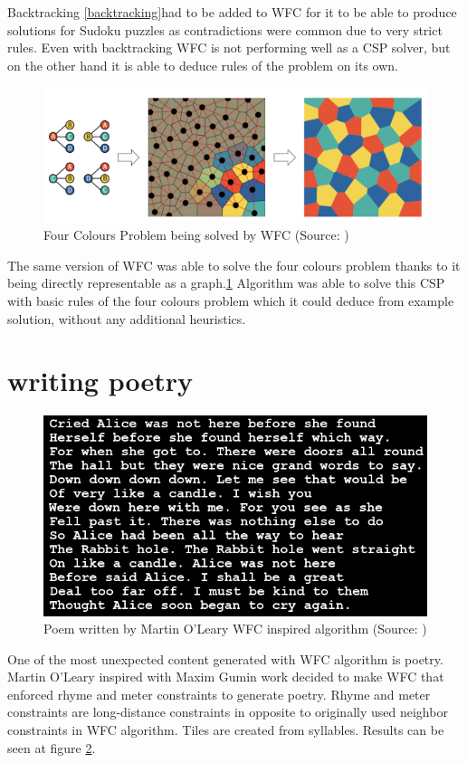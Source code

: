\documentclass[shortabstract, english, inz]{iithesis}
\begin{document}
Backtracking \ref{backtracking}had to be added to WFC for it to be able to produce solutions for Sudoku puzzles as contradictions were common due to very strict rules. Even with backtracking WFC is not performing well as a CSP solver, but on the other hand it is able to deduce rules of the problem on its own.\cite{GraphBased}
\begin{figure}[H]
\centering
\includegraphics[width=1\textwidth, angle=0]{images/fourcolours.png}
\caption{Four Colours Problem being solved by WFC (Source: \cite{GraphBased})}
\label{fig:fourcolours}
\end{figure}
The same version of WFC was able to solve the four colours problem thanks to it being directly representable as a graph.\ref{fig:fourcolours} Algorithm was able to solve this CSP with basic rules of the four colours problem which it could deduce from example solution, without any additional heuristics.\cite{GraphBased}


\section{writing poetry}
\begin{figure}[H]
\centering
\includegraphics[width=1\textwidth, angle=0]{images/poem.png}
\caption{Poem written by Martin O’Leary WFC inspired algorithm (Source: \cite{wfcpoem})}
\label{fig:poem}
\end{figure}
One of the most unexpected content generated with WFC algorithm is poetry. Martin O’Leary inspired with Maxim Gumin work decided to make WFC that enforced rhyme and meter constraints to generate poetry. Rhyme and meter constraints are long-distance constraints in opposite to originally used neighbor constraints in WFC algorithm. Tiles are created from syllables. Results can be seen at figure \ref{fig:poem}.\cite{Smith, wfcpoem}
\end{document}

